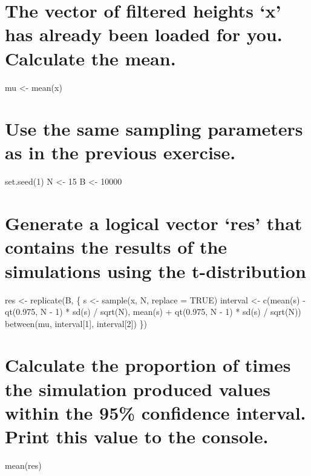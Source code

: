 \documentclass[
]{article}
\begin{document}
\hypertarget{the-vector-of-filtered-heights-x-has-already-been-loaded-for-you.-calculate-the-mean.}{%
\section{The vector of filtered heights `x' has already been loaded for
you. Calculate the
mean.}\label{the-vector-of-filtered-heights-x-has-already-been-loaded-for-you.-calculate-the-mean.}}

mu \textless- mean(x)

\hypertarget{use-the-same-sampling-parameters-as-in-the-previous-exercise.}{%
\section{Use the same sampling parameters as in the previous
exercise.}\label{use-the-same-sampling-parameters-as-in-the-previous-exercise.}}

set.seed(1) N \textless- 15 B \textless- 10000

\hypertarget{generate-a-logical-vector-res-that-contains-the-results-of-the-simulations-using-the-t-distribution}{%
\section{Generate a logical vector `res' that contains the results of
the simulations using the
t-distribution}\label{generate-a-logical-vector-res-that-contains-the-results-of-the-simulations-using-the-t-distribution}}

res \textless- replicate(B, \{ s \textless- sample(x, N, replace = TRUE)
interval \textless- c(mean(s) - qt(0.975, N - 1) * sd(s) / sqrt(N),
mean(s) + qt(0.975, N - 1) * sd(s) / sqrt(N)) between(mu,
interval{[}1{]}, interval{[}2{]}) \})

\hypertarget{calculate-the-proportion-of-times-the-simulation-produced-values-within-the-95-confidence-interval.-print-this-value-to-the-console.-1}{%
\section{Calculate the proportion of times the simulation produced
values within the 95\% confidence interval. Print this value to the
console.}\label{calculate-the-proportion-of-times-the-simulation-produced-values-within-the-95-confidence-interval.-print-this-value-to-the-console.-1}}

mean(res)

\begin{verbatim}
\end{verbatim}
\end{document}
